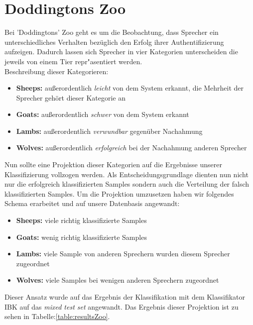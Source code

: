 \section{Doddingtons Zoo}


Bei 'Doddingtons' Zoo geht es um die Beobachtung, dass Sprecher ein unterschiedliches Verhalten bezüglich den Erfolg ihrer Authentifizierung aufzeigen. \cite{zoo}
Dadurch lassen sich Sprecher in vier Kategorien unterscheiden die jeweils von einem Tier repr"asentiert werden. \\

Beschreibung dieser Kategorieren: \cite{dittmann}
\begin{itemize}
	\item[\textbullet]  \textbf{Sheeps:} außerordentlich \textit{leicht} von dem System erkannt, die Mehrheit der Sprecher gehört dieser Kategorie an
	\item[\textbullet]  \textbf{Goats:} außerordentlich \textit{schwer} von dem System erkannt
	\item[\textbullet]  \textbf{Lambs:} außerordentlich \textit{verwundbar} gegenüber Nachahmung
	\item[\textbullet]  \textbf{Wolves:} außerordentlich \textit{erfolgreich} bei der Nachahmung anderen Sprecher
\end{itemize}

Nun sollte eine Projektion dieser Kategorien auf die Ergebnisse unserer Klassifizierung vollzogen werden. Als Entscheidungsgrundlage dienten nun nicht nur die erfolgreich klassifizierten Samples sondern auch die Verteilung der falsch klassifizierten Samples. Um die Projektion umzusetzen haben wir folgendes Schema erarbeitet und auf unsere Datenbasis angewandt:

\begin{itemize}
	\item[\textbullet]  \textbf{Sheeps:} viele richtig klassifizierte Samples
	\item[\textbullet]  \textbf{Goats:} wenig richtig klassifizierte Samples
	\item[\textbullet]  \textbf{Lambs:} viele Sample von anderen Sprechern wurden diesem Sprecher zugeordnet
	\item[\textbullet]  \textbf{Wolves:} viele Samples bei wenigen anderen Sprechern zugeordnet
\end{itemize}

Dieser Ansatz wurde auf das Ergebnis der Klassifikation mit dem Klassifikator IBK auf das \textit{mixed test set} angewandt. Das Ergebnis dieser Projektion ist zu sehen in Tabelle:\ref{table:resultsZoo}.\\


